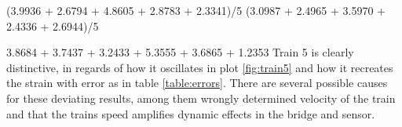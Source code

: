 (3.9936 + 2.6794 + 4.8605 + 2.8783 + 2.3341)/5
(3.0987 + 2.4965 + 3.5970 + 2.4336 + 2.6944)/5


3.8684 + 3.7437 + 3.2433 + 5.3555 + 3.6865 + 1.2353
Train 5 is clearly distinctive, in regards of how it oscillates in plot \ref{fig:train5} and how it recreates the strain with error as in table \ref{table:errors}. There are several possible causes for these deviating results, among them wrongly determined velocity of the train and that the trains speed amplifies dynamic effects in the bridge and sensor.

